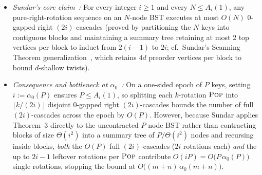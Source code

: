 \documentclass[11pt]{article}
\theoremstyle{definition}
\theoremstyle{remark}
\newcommand{\POP}{\textnormal{\scshape Pop}}
\begin{document}
\begin{itemize}[leftmargin=2em, itemsep=2pt]
  \item \emph{Sundar's core claim~\cite[Section~2.1, Theorem~3]{Sundar1992}:} For every integer $i \ge 1$ and every $N \le A_i(1)$, any pure-right-rotation sequence on an $N$-node BST executes at most $O(N)$ $0$-gapped right $(2i)$-cascades (proved by partitioning the $N$ keys into contiguous blocks and maintaining a summary tree retaining at most $2$ top vertices per block to induct from $2(i - 1)$ to $2i$; cf.~Sundar's Scanning Theorem generalization~\cite[Section~4.2, Theorem~8]{Sundar1992}, which retains $4d$ preorder vertices per block to bound $d$-shallow twists).
  \item \emph{Consequence and bottleneck at $\alpha_0$~\cite[Section~3, Lemma~9]{Sundar1992}:} On a one-sided epoch of $P$ keys, setting $i := \alpha_0(P)$ ensures $P \le A_i(1)$, so splitting each $k$-rotation $\POP$ into $\lfloor k / (2i) \rfloor$ disjoint $0$-gapped right $(2i)$-cascades bounds the number of full $(2i)$-cascades across the epoch by $O(P)$. However, because Sundar applies Theorem~3 directly to the uncontracted $P$-node BST rather than contracting blocks of size $\Theta(i^2)$ into a summary tree of $P / \Theta(i^2)$ nodes and recursing inside blocks, \emph{both} the $O(P)$ full $(2i)$-cascades ($2i$ rotations each) \emph{and} the up to $2i - 1$ leftover rotations per $\POP$ contribute $O(i P) = O\big(P\,\alpha_0(P)\big)$ single rotations, stopping the bound at $O\big((m + n)\,\alpha_0(m + n)\big)$.
\end{itemize}
\end{document}
